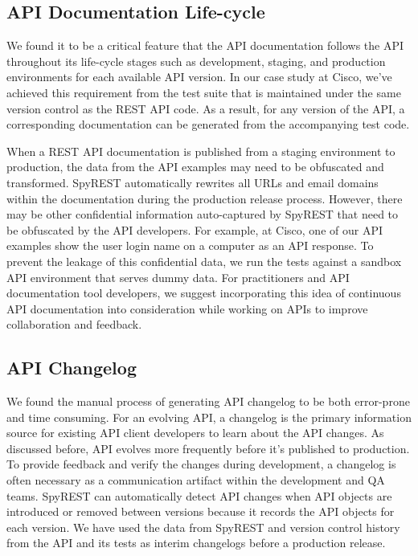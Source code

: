 \documentclass[10pt, conference]{IEEEtran}
\begin{document}
\subsection{API Documentation Life-cycle}
We found it to be a critical feature that the API documentation follows the API throughout its life-cycle stages such as development, staging, and production environments for each available API version. In our case study at Cisco, we've achieved this requirement from the test suite that is maintained under the same version control as the REST API code. As a result, for any version of the API, a corresponding documentation can be generated from the accompanying test code.

When a REST API documentation is published from a staging environment to production, the data from the API examples may need to be obfuscated and transformed. SpyREST automatically rewrites all  URLs and email domains within the documentation during the production release process. However, there may be other confidential information auto-captured by SpyREST that need to be obfuscated by the API developers. For example, at Cisco, one of our API examples show the user login name on a computer as an API response. To prevent the leakage of this confidential data, we run the tests against a sandbox API environment that serves dummy data. For practitioners and API documentation tool developers, we suggest incorporating this idea of continuous API documentation into consideration while working on APIs to improve collaboration and feedback.

\subsection{API Changelog}
We found the manual process of generating API changelog to be both error-prone and time consuming. For an evolving API, a changelog is the primary information source for existing API client developers to learn about the API changes. As discussed before, API evolves more frequently before it's published to production. To provide feedback and verify the changes during development, a changelog is often necessary as a communication artifact within the development and QA teams. SpyREST can automatically detect API changes when API objects are introduced or removed between versions because it records the API objects for each version. We have used the data from SpyREST and version control history from the API and its tests as interim changelogs before a production release.
\end{document}
